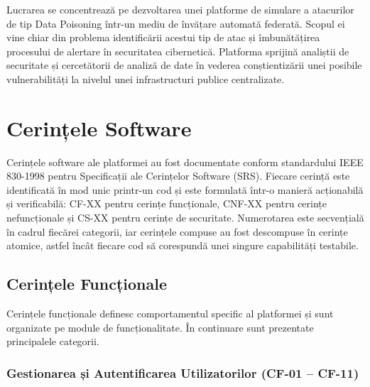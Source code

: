 \documentclass[../../main.tex]{subfiles}
\begin{document}
Lucrarea se concentrează pe dezvoltarea unei platforme de simulare a atacurilor de tip Data Poisoning într-un mediu de învățare automată federată.
Scopul ei vine chiar din problema identificării acestui tip de atac și îmbunătățirea procesului de alertare în securitatea cibernetică. 
Platforma sprijină analiștii de securitate și cercetătorii de analiză de date în vederea conștientizării unei posibile vulnerabilități la nivelul unei infrastructuri publice centralizate.

    \section{Cerințele Software}

    Cerințele software ale platformei au fost documentate conform standardului IEEE 830-1998 pentru Specificații ale Cerințelor Software (SRS). Fiecare cerință este identificată în mod unic printr-un cod și este formulată într-o manieră acționabilă și verificabilă: CF-XX pentru cerințe funcționale, CNF-XX pentru cerințe nefuncționale și CS-XX pentru cerințe de securitate. Numerotarea este secvențială în cadrul fiecărei categorii, iar cerințele compuse au fost descompuse în cerințe atomice, astfel încât fiecare cod să corespundă unei singure capabilități testabile.

        \subsection{Cerințele Funcționale}

        Cerințele funcționale definesc comportamentul specific al platformei și sunt organizate pe module de funcționalitate. În continuare sunt prezentate principalele categorii.

        \subsubsection{Gestionarea și Autentificarea Utilizatorilor (CF-01 -- CF-11)}
\end{document}
